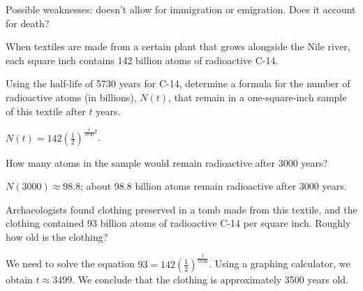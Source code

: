 \begin{exercises}
\begin{problem}
\begin{subproblem}
\begin{shortsolution}
		Possible weaknesses: doesn't allow for immigration or emigration. Does it account for death?
	\end{shortsolution}
\end{subproblem}
\end{problem}
			
\begin{problem}[Textiles]
When textiles are made from a certain plant that grows alongside the Nile river, each square inch contains 142 billion atoms of radioactive C-14.  
\begin{subproblem}
	Using the half-life of 5730 years	for C-14, determine a formula for the number of radioactive atoms (in billions), $N(t)$,
	that remain in a one-square-inch sample of this textile after $t$ years.
	\begin{shortsolution}
		$N(t)=142\left(\frac12\right)^{\frac1{5730}t}$.
	\end{shortsolution}
\end{subproblem}
\begin{subproblem}
	How many atoms in the sample would remain radioactive after 3000 years?
	\begin{shortsolution}
		$N(3000)\approx 98.8$; about 98.8 billion atoms remain radioactive after 3000 years.
	\end{shortsolution}
\end{subproblem}
\begin{subproblem}
	Archaeologists found clothing preserved in a tomb made from this textile, and the clothing contained 93 billion atoms of 
	radioactive C-14 per square inch.  Roughly how old is the clothing?
	\begin{shortsolution}
		We need to solve the equation $93=142\left( \frac{1}{2} \right)^{\frac{t}{5730}}$. Using a graphing calculator, we obtain 
		$t\approx 3499$. We conclude that the clothing is approximately 3500 years old.
	\end{shortsolution}
\end{subproblem}
\end{problem}
			

\end{exercises}
